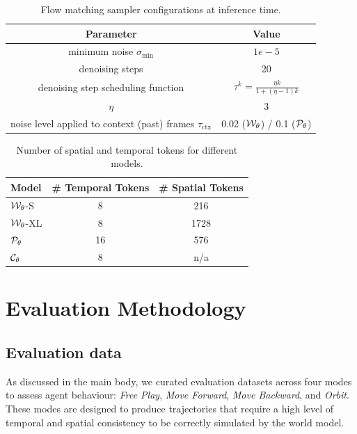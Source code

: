 \documentclass{article}
\theoremstyle{plain}
\theoremstyle{definition}
\theoremstyle{remark}
\begin{document}
\begin{table}[htb!]
\centering
\caption{Flow matching sampler configurations at inference time.}
\begin{tabular}{cc}\toprule  
Parameter & Value \\
\midrule
minimum noise $\sigma_\text{min}$ & $1e-5$ \\
denoising steps & 20 \\
denoising step scheduling function & $\tau^k = \frac{\eta k}{1 + (\eta-1)k} $ \\
$\eta$ & 3 \\
noise level applied to context (past) frames $\tau_\text{ctx}$ & 0.02 (${\mathcal{W}}_\theta$) / 0.1 (${\mathcal{P}}_\theta$) \\

\bottomrule
\end{tabular}
\label{table:samplers}
\end{table}

\begin{table}[htb!]
  \centering
  \caption{Number of spatial and temporal tokens for different models.}
    \begin{tabular}{lcc}
    \toprule
    Model & \# Temporal Tokens & \# Spatial Tokens \\
    \midrule
     ${\mathcal{W}}_\theta$-S & 8 & 216 \\
     ${\mathcal{W}}_\theta$-XL & 8 & 1728 \\
     ${\mathcal{P}}_\theta$ & 16 & 576 \\
     ${\mathcal{C}}_\theta$ & 8 & n/a \\
    \bottomrule
    \end{tabular}
\end{table}

\clearpage

\section{Evaluation Methodology}\label{app:data_met}


\subsection{Evaluation data}

As discussed in the main body, we curated evaluation datasets across four modes to assess agent behaviour: \textit{Free Play}, \textit{Move Forward}, \textit{Move Backward}, and \textit{Orbit}.
These modes are designed to produce trajectories that require a high level of temporal and spatial consistency to be correctly simulated by the world model.
\end{document}

